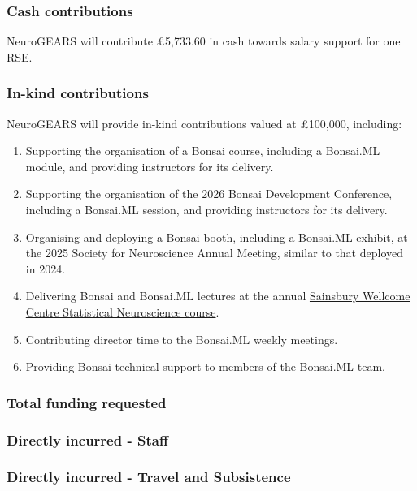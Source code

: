 \subsubsection{Cash contributions}

NeuroGEARS will contribute £5,733.60 in cash towards salary support for one RSE.

\subsubsection{In-kind contributions}

NeuroGEARS will provide in-kind contributions valued at £100,000, including:

\begin{enumerate}
    \item Supporting the organisation of a Bonsai course, including a Bonsai.ML module, and providing instructors for its delivery.

    \item Supporting the organisation of the 2026 Bonsai Development Conference, including a Bonsai.ML session, and providing instructors for its delivery.

    \item Organising and deploying a Bonsai booth, including a Bonsai.ML exhibit, at the 2025 Society for Neuroscience Annual Meeting, similar to that deployed in 2024.

    \item Delivering Bonsai and Bonsai.ML lectures at the annual
    \href{https://github.com/joacorapela/statNeuro2025}{Sainsbury Wellcome Centre Statistical Neuroscience course}.

    \item Contributing director time to the Bonsai.ML weekly meetings.

    \item Providing Bonsai technical support to members of the Bonsai.ML team.
\end{enumerate}

\subsubsection{Total funding requested}

\subsubsection{Directly incurred - Staff}

\subsubsection{Directly incurred - Travel and Subsistence}

